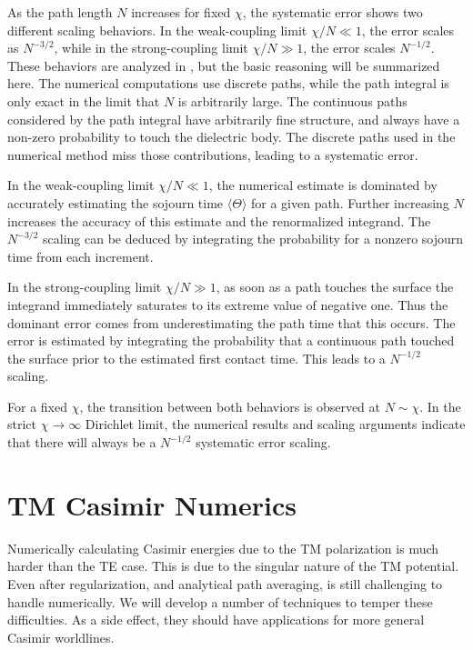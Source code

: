 As the path length $N$ increases for fixed $\chi$, the systematic error shows two different scaling behaviors.  
In the weak-coupling limit $\chi/N\ll 1$, the error scales as $N^{-3/2}$, while in the strong-coupling limit
$\chi/N\gg 1$, the error scales $N^{-1/2}$.  
These behaviors are analyzed in \citet{Mackrory2016}, but the basic reasoning will be summarized here.
The numerical computations use discrete paths, 
while the path integral is only exact in the limit that $N$ is arbitrarily large.  The continuous paths considered by the path integral
have arbitrarily fine structure, and always have a non-zero probability to touch the dielectric body.
The discrete paths used in the numerical method miss those contributions, leading to a systematic error.  

In the weak-coupling limit $\chi/N\ll 1$, the numerical estimate is dominated by accurately estimating the sojourn
time $\langle\Theta\rangle$ for a given path.  Further increasing $N$ increases the accuracy of this 
estimate and the renormalized integrand.  The $N^{-3/2}$ scaling can be deduced by integrating the probability for a nonzero sojourn time
from each increment.  

In the strong-coupling limit $\chi/N\gg 1$, as soon as a path touches the surface the integrand immediately saturates
to its extreme value of negative one.
Thus the dominant error comes from underestimating the path time that this occurs.  The error 
is estimated by integrating the probability that a continuous path touched the surface
prior to the estimated first contact time.  This leads to a $N^{-1/2}$ scaling.

For a fixed $\chi$, the transition between both behaviors is observed at $N\sim\chi$. 
In the strict $\chi\rightarrow\infty$ Dirichlet limit, the numerical results and scaling 
arguments indicate that there will always be a $N^{-1/2}$ systematic error scaling.   

\section{TM Casimir Numerics}
\label{sec:TM_numerics}

Numerically calculating Casimir energies due to the TM polarization is much harder than the TE case. 
This is due to the singular nature of the TM potential.
Even after regularization, and analytical path averaging, is still challenging to handle numerically.
We will develop a number of techniques to temper these difficulties.
As a side effect, they should have applications for more general Casimir worldlines.

